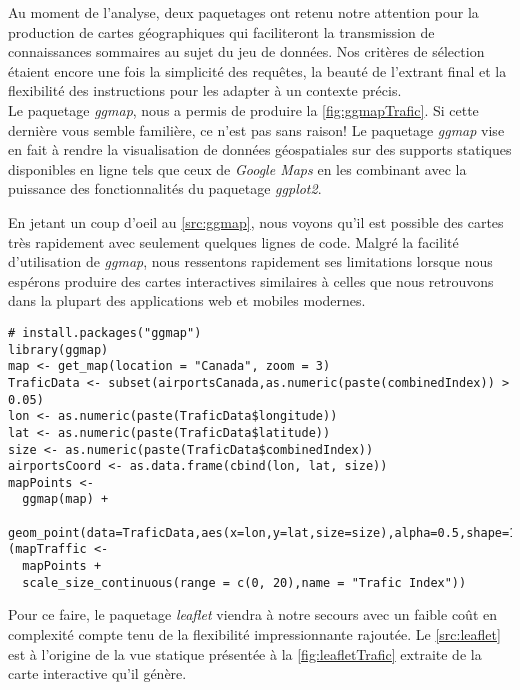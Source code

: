 Au moment de l'analyse, deux paquetages ont retenu notre attention pour la production de cartes géographiques qui faciliteront la transmission de connaissances sommaires au sujet du jeu de données. Nos critères de sélection étaient encore une fois la simplicité des requêtes, la beauté de l'extrant final et la flexibilité des instructions pour les adapter à un contexte précis. \\

Le paquetage \emph{ggmap}, nous a permis de produire la \autoref{fig:ggmapTrafic}. Si cette dernière vous semble familière, ce n'est pas sans raison! Le paquetage \emph{ggmap} vise en fait à rendre la visualisation de données géospatiales sur des supports statiques disponibles en ligne tels que ceux de \emph{Google Maps} en les combinant avec la puissance des fonctionnalités du paquetage \emph{ggplot2}. \cite{Rpackage:ggmap} \\


En jetant un coup d'oeil au \autoref{src:ggmap}, nous voyons qu'il est possible des cartes très rapidement avec seulement quelques lignes de code. Malgré la facilité d'utilisation de \emph{ggmap}, nous ressentons rapidement ses limitations lorsque nous espérons produire des cartes interactives similaires à celles que nous retrouvons dans la plupart des applications web et mobiles modernes. \\

\begin{lstlisting}[caption = Générer une carte du trafic aérien avec \emph{ggmap},label=src:ggmap]
# install.packages("ggmap")
library(ggmap)
map <- get_map(location = "Canada", zoom = 3)
TraficData <- subset(airportsCanada,as.numeric(paste(combinedIndex)) > 0.05)
lon <- as.numeric(paste(TraficData$longitude))
lat <- as.numeric(paste(TraficData$latitude))
size <- as.numeric(paste(TraficData$combinedIndex))
airportsCoord <- as.data.frame(cbind(lon, lat, size))
mapPoints <- 
  ggmap(map) + 
  geom_point(data=TraficData,aes(x=lon,y=lat,size=size),alpha=0.5,shape=16)
(mapTraffic <-  
  mapPoints + 
  scale_size_continuous(range = c(0, 20),name = "Trafic Index"))
\end{lstlisting}

\vspace{\baselineskip}
Pour ce faire, le paquetage \emph{leaflet} \cite{leaflet} viendra à notre secours avec un faible coût en complexité compte tenu de la flexibilité impressionnante rajoutée. Le \autoref{src:leaflet} est à l'origine de la vue statique présentée à la \autoref{fig:leafletTrafic} extraite de la carte interactive qu'il génère. \\

